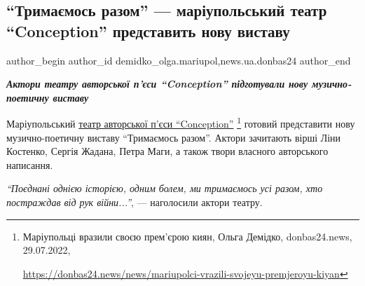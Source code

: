  
 
 
 
 
 
\subsection{\enquote{Тримаємось разом} — маріупольський театр \enquote{Conception} представить нову виставу}
\label{sec:13_10_2022.stz.news.ua.donbas24.1.trymajemos_razom_mrpl_teatr_conception_nova_vystava}
 
\ifcmt
 author_begin
   author_id demidko_olga.mariupol,news.ua.donbas24
 author_end
\fi



\begin{center}
  \em\color{blue}\bfseries\Large
  Актори театру авторської п'єси \enquote{Conception} підготували нову музично-поетичну виставу
\end{center}

Маріупольський \href{https://donbas24.news/news/mariupolci-vrazili-svojeyu-premjeroyu-kiyan}{театр авторської п'єси \enquote{Conception}}%
\footnote{Маріупольці вразили своєю прем'єрою киян, Ольга Демідко, donbas24.news, 29.07.2022, \par%
\url{https://donbas24.news/news/mariupolci-vrazili-svojeyu-premjeroyu-kiyan}%
} готовий представити нову
музично-поетичну виставу \enquote{Тримаємось разом}. Актори зачитають вірші Ліни
Костенко, Сергія Жадана, Петра Маги, а також твори власного авторського
написання.

\begin{leftbar}
\emph{\enquote{Поєднані однією історією, одним болем, ми тримаємось усі разом,
хто постраждав від рук війни...}}, — наголосили актори театру. 
\end{leftbar}

